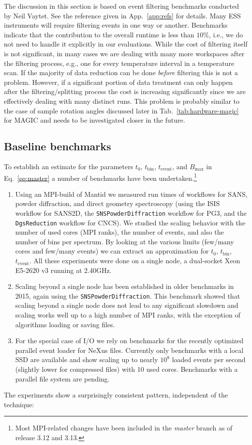 \documentclass[a4paper,english,numbers=noenddot,bibliography=totoc,chapterprefix=on,DIV=12]{scrartcl}
\newcommand{\Tbin}{t_{\text{bin}}}
\newcommand{\Tevent}{t_{\text{event}}}
\newcommand{\Bmax}{B_{\text{max}}}
\newcommand{\magic}{MAGIC\xspace}
\newcommand{\mantid}{Mantid\xspace}
\newcommand{\nexus}{NeXus\xspace}
\begin{document}
The discussion in this section is based on event filtering benchmarks conducted by Neil Vaytet.
See the reference given in App.~\ref{app:refs} for details.
Many ESS instruments will require filtering events in one way or another.
Benchmarks indicate that the contribution to the overall runtime is less than $10\%$, i.e., we do not need to handle it explicitly in our evaluations.
While the cost of filtering itself is not significant, in many cases we are dealing with many more workspaces after the filtering process, e.g., one for every temperature interval in a temperature scan.
If the majority of data reduction can be done \emph{before} filtering this is not a problem.
However, if a significant portion of data treatment can only happen after the filtering/splitting process the cost is increasing significantly since we are effectively dealing with many distinct runs.
This problem is probably similar to the case of sample rotation angles discussed later in Tab.~\ref{tab:hardware-magic} for \magic and needs to be investigated closer in the future.


\subsection{Baseline benchmarks}
\label{sec:benchmarks}

To establish an estimate for the parameters $t_0$, $\Tbin$, $\Tevent$, and $\Bmax$ in Eq.~\eqref{eq:master} a number of benchmarks have been undertaken.\footnote{Most MPI-related changes have been included in the \emph{master} branch as of release 3.12 and 3.13.}

\begin{enumerate}
  \item Using an MPI-build of \mantid we measured run times of workflows for SANS, powder diffraction, and direct geometry spectroscopy (using the ISIS workflow for SANS2D, the \verb|SNSPowderDiffraction| workflow for PG3, and the \verb|DgsReduction| workflow for CNCS).
    We studied the scaling behavior with the number of used cores (MPI ranks), the number of events, and also the number of bins per spectrum.
    By looking at the various limits (few/many cores and few/many events) we can extract an approximation for $t_0$, $\Tbin$, $\Tevent$.
    All these experiments were done on a single node, a dual-socket Xeon E5-2620 v3 running at 2.40GHz.
  \item Scaling beyond a single node has been established in older benchmarks in 2015, again using the \verb|SNSPowderDiffraction|.
    This benchmark showed that scaling beyond a single node does not lead to any significant slowdown and scaling works well up to a high number of MPI ranks, with the exception of algorithms loading or saving files.
  \item For the special case of I/O we rely on benchmarks for the recently optimized parallel event loader for \nexus files.
    Currently only benchmarks with a local SSD are available and show scaling up to nearly $10^8$ loaded events per second (slightly lower for compressed files) with 10 used cores.
    Benchmarks with a parallel file system are pending.
\end{enumerate}
The experiments show a surprisingly consistent pattern, independent of the technique:
\end{document}
